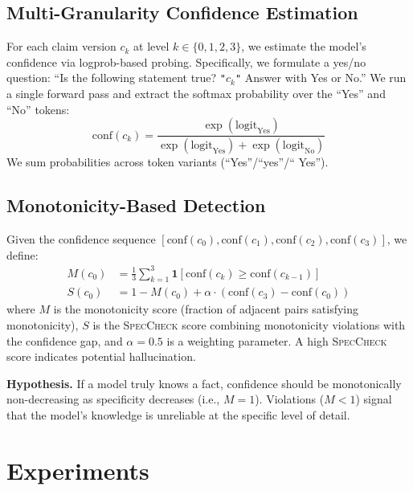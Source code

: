 \documentclass{article}
\newcommand{\speccheck}{\textsc{SpecCheck}}
\begin{document}
\subsection{Multi-Granularity Confidence Estimation}

For each claim version $c_k$ at level $k \in \{0, 1, 2, 3\}$, we estimate the model's confidence via logprob-based probing.
Specifically, we formulate a yes/no question: ``Is the following statement true? \texttt{"}$c_k$\texttt{"} Answer with Yes or No.''
We run a single forward pass and extract the softmax probability over the ``Yes'' and ``No'' tokens:
\begin{equation}
    \text{conf}(c_k) = \frac{\exp(\text{logit}_{\text{Yes}})}{\exp(\text{logit}_{\text{Yes}}) + \exp(\text{logit}_{\text{No}})}
\end{equation}
We sum probabilities across token variants (``Yes''/``yes''/`` Yes'').

\subsection{Monotonicity-Based Detection}

Given the confidence sequence $[\text{conf}(c_0), \text{conf}(c_1), \text{conf}(c_2), \text{conf}(c_3)]$, we define:
\begin{align}
    M(c_0) &= \frac{1}{3} \sum_{k=1}^{3} \mathbf{1}[\text{conf}(c_k) \geq \text{conf}(c_{k-1})] \label{eq:mono} \\
    S(c_0) &= 1 - M(c_0) + \alpha \cdot (\text{conf}(c_3) - \text{conf}(c_0)) \label{eq:speccheck}
\end{align}
where $M$ is the monotonicity score (fraction of adjacent pairs satisfying monotonicity), $S$ is the \speccheck{} score combining monotonicity violations with the confidence gap, and $\alpha = 0.5$ is a weighting parameter.
A high \speccheck{} score indicates potential hallucination.

\textbf{Hypothesis.} If a model truly knows a fact, confidence should be monotonically non-decreasing as specificity decreases (i.e., $M = 1$).
Violations ($M < 1$) signal that the model's knowledge is unreliable at the specific level of detail.


\section{Experiments}
\label{sec:experiments}
\end{document}
